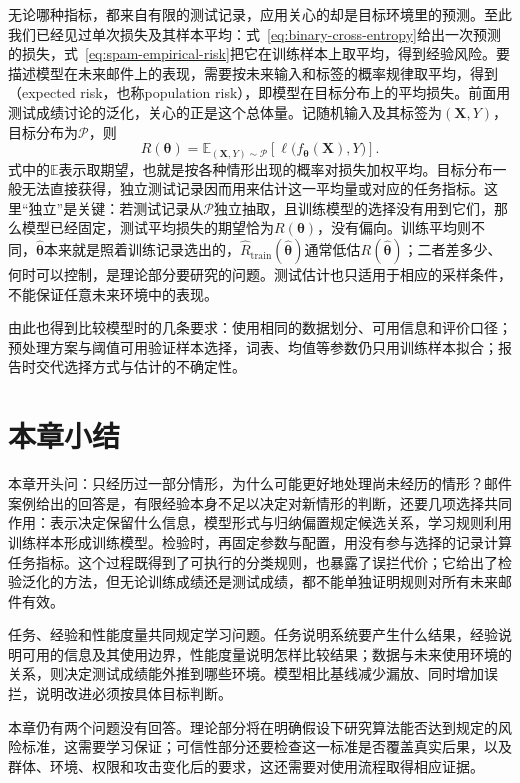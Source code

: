 无论哪种指标，都来自有限的测试记录，应用关心的却是目标环境里的预测。至此我们已经见过单次损失及其样本平均：式~\eqref{eq:binary-cross-entropy}给出一次预测的损失，式~\eqref{eq:spam-empirical-risk}把它在训练样本上取平均，得到经验风险。要描述模型在未来邮件上的表现，需要按未来输入和标签的概率规律取平均，得到（expected risk，也称population risk），即模型在目标分布上的平均损失。前面用测试成绩讨论的泛化，关心的正是这个总体量。记随机输入及其标签为$(\bm{X},Y)$，目标分布为$\mathcal{P}$，则
\begin{equation}
  R(\bm{\theta})
  =\mathbb{E}_{(\bm{X},Y)\sim\mathcal{P}}
  \left[\ell\bigl(f_{\bm{\theta}}(\bm{X}),Y\bigr)\right].
  \label{eq:expected-risk}
\end{equation}
式中的$\mathbb{E}$表示取期望，也就是按各种情形出现的概率对损失加权平均。目标分布一般无法直接获得，独立测试记录因而用来估计这一平均量或对应的任务指标。这里“独立”是关键：若测试记录从$\mathcal{P}$独立抽取，且训练模型的选择没有用到它们，那么模型已经固定，测试平均损失的期望恰为$R(\bm{\theta})$，没有偏向。训练平均则不同，$\hat{\bm{\theta}}$本来就是照着训练记录选出的，$\hat{R}_{\mathrm{train}}(\hat{\bm{\theta}})$通常低估$R(\hat{\bm{\theta}})$；二者差多少、何时可以控制，是理论部分要研究的问题。测试估计也只适用于相应的采样条件，不能保证任意未来环境中的表现。

由此也得到比较模型时的几条要求：使用相同的数据划分、可用信息和评价口径；预处理方案与阈值可用验证样本选择，词表、均值等参数仍只用训练样本拟合；报告时交代选择方式与估计的不确定性。

\section{本章小结}
\label{sec:introduction-summary}

本章开头问：只经历过一部分情形，为什么可能更好地处理尚未经历的情形？邮件案例给出的回答是，有限经验本身不足以决定对新情形的判断，还要几项选择共同作用：表示决定保留什么信息，模型形式与归纳偏置规定候选关系，学习规则利用训练样本形成训练模型。检验时，再固定参数与配置，用没有参与选择的记录计算任务指标。这个过程既得到了可执行的分类规则，也暴露了误拦代价；它给出了检验泛化的方法，但无论训练成绩还是测试成绩，都不能单独证明规则对所有未来邮件有效。

任务、经验和性能度量共同规定学习问题。任务说明系统要产生什么结果，经验说明可用的信息及其使用边界，性能度量说明怎样比较结果；数据与未来使用环境的关系，则决定测试成绩能外推到哪些环境。模型相比基线减少漏放、同时增加误拦，说明改进必须按具体目标判断。

本章仍有两个问题没有回答。理论部分将在明确假设下研究算法能否达到规定的风险标准，这需要学习保证；可信性部分还要检查这一标准是否覆盖真实后果，以及群体、环境、权限和攻击变化后的要求，这还需要对使用流程取得相应证据。

